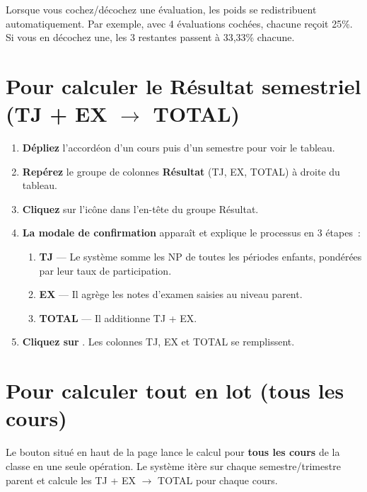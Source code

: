 \begin{astuce}
Lorsque vous cochez/d\'ecochez une \'evaluation, les poids se redistribuent automatiquement. Par exemple, avec 4 \'evaluations coch\'ees, chacune re\c{c}oit 25\%. Si vous en d\'ecochez une, les 3 restantes passent \`a 33,33\% chacune.
\end{astuce}

\section{Pour calculer le R\'esultat semestriel (TJ + EX $\rightarrow$ TOTAL)}

\begin{etape}[title=Proc\'edure : Calculer TJ + EX = TOTAL]
\begin{enumerate}[leftmargin=1.5cm,label=\textbf{\arabic*.},itemsep=10pt]
  \item \textbf{D\'epliez} l'accord\'eon d'un cours puis d'un semestre pour voir le tableau.
  \item \textbf{Rep\'erez} le groupe de colonnes \textbf{R\'esultat} (TJ, EX, TOTAL) \`a droite du tableau.
  \item \textbf{Cliquez} sur l'ic\^one \textcolor{amber}{\faCalculator} dans l'en-t\^ete du groupe R\'esultat.
  \item \textbf{La modale de confirmation} appara\^it et explique le processus en 3 \'etapes~:
  \begin{enumerate}
    \item \textbf{TJ} --- Le syst\`eme somme les NP de toutes les p\'eriodes enfants, pond\'er\'ees par leur taux de participation.
    \item \textbf{EX} --- Il agr\`ege les notes d'examen saisies au niveau parent.
    \item \textbf{TOTAL} --- Il additionne TJ + EX.
  \end{enumerate}
  \item \textbf{Cliquez sur} . Les colonnes TJ, EX et TOTAL se remplissent.
\end{enumerate}
\end{etape}

\section{Pour calculer tout en lot (tous les cours)}

Le bouton  situ\'e en haut de la page lance le calcul pour \textbf{tous les cours} de la classe en une seule op\'eration. Le syst\`eme it\`ere sur chaque semestre/trimestre parent et calcule les TJ + EX $\rightarrow$ TOTAL pour chaque cours.


